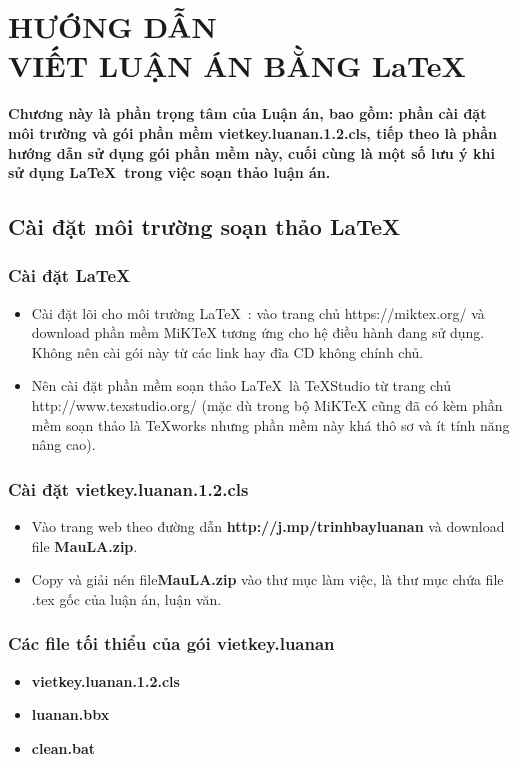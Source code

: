 
\chapter[HƯỚNG DẪN VIẾT LUẬN ÁN BẰNG \LaTeX]{HƯỚNG DẪN\\ VIẾT LUẬN ÁN BẰNG \LaTeX} \label{chchukytapthedathanhphan}%
 
\textbf{Chương này là phần trọng tâm của Luận án, bao gồm: phần cài đặt môi trường và gói phần mềm vietkey.luanan.1.2.cls, tiếp theo là phần hướng dẫn sử dụng gói phần mềm này, cuối cùng là một số lưu ý khi sử dụng \LaTeX\ trong việc soạn thảo luận án.}

\section{\bf Cài đặt môi trường soạn thảo \LaTeX} \label{mucchkydatp}

\subsection{Cài đặt \LaTeX}
\begin{itemize}
	\item Cài đặt lõi cho môi trường \LaTeX\ : vào trang chủ https://miktex.org/ và download phần mềm MiKTeX tương ứng cho hệ điều hành đang sử dụng. Không nên cài gói này từ các link hay đĩa CD không chính chủ.
	\item Nên cài đặt phần mềm soạn thảo \LaTeX\ là TeXStudio từ trang chủ   http://www.texstudio.org/ (mặc dù trong bộ MiKTeX cũng đã có kèm phần mềm soạn thảo là TeXworks nhưng phần mềm này khá thô sơ và ít tính năng nâng cao).
\end{itemize}

\subsection{Cài đặt vietkey.luanan.1.2.cls}
\begin{itemize}
	\item Vào trang web theo đường dẫn \textbf{http://j.mp/trinhbayluanan} và download file \textbf{MauLA.zip}.
	\item Copy  và giải nén file\textbf{MauLA.zip} vào thư mục làm việc, là thư mục chứa file .tex gốc của luận án, luận văn.
\end{itemize}

\subsection{Các file tối thiểu của gói vietkey.luanan}
\begin{tcolorbox}
\begin{itemize}
	\item \textbf{vietkey.luanan.1.2.cls}
	\item \textbf{luanan.bbx}
	\item \textbf{clean.bat}
\end{itemize}
\end{tcolorbox}

